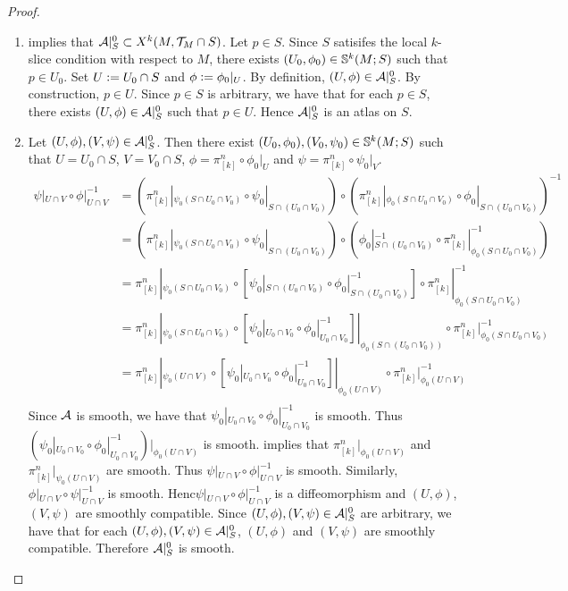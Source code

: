 \documentclass{book}
\begin{document}
	\begin{proof}\
		\begin{enumerate}
			\item {} implies that $\MA|_S^0 \subset X^k(M, \MT_M \cap S)$. Let $p \in S$. Since $S$ satisifes the local $k$-slice condition with respect to $M$, there exists $(U_0, \phi_0) \in \S^k(M; S)$ such that $p \in U_0$. Set $U \defeq U_0 \cap S$ and $\phi \defeq \phi_0|_{U}$. By definition, $(U, \phi) \in \MA|_S^0$. By construction, $p \in U$. Since $p \in S$ is arbitrary, we have that for each $p \in S$, there exists $(U, \phi) \in \MA|_S^0$ such that $p \in U$. Hence $\MA|_S^0$ is an atlas on $S$.
			\item Let $(U, \phi), (V, \psi) \in \MA|_S^0$. Then there exist $(U_0, \phi_0), (V_0, \psi_0) \in \S^k(M; S)$ such that $U = U_0 \cap S$, $V = V_0 \cap S$, $\phi = \pi^n_{[k]} \circ \phi_0|_U$ and $\psi = \pi^n_{[k]} \circ \psi_0|_V$. 
			\begin{align*}
				\psi|_{U \cap V} \circ \phi|_{U \cap V}^{-1}
				& = (\pi^n_{[k]}|_{\psi_0(S \cap U_0 \cap V_0)} \circ \psi_0|_{S \cap (U_0 \cap V_0)}) \circ (\pi^n_{[k]}|_{\phi_0(S \cap U_0 \cap V_0)} \circ \phi_0|_{S \cap (U_0 \cap V_0)})^{-1} \\
				& = (\pi^n_{[k]}|_{\psi_0(S \cap U_0 \cap V_0)} \circ \psi_0|_{S \cap (U_0 \cap V_0)}) \circ (\phi_0|_{S \cap (U_0 \cap V_0)}^{-1} \circ \pi^n_{[k]}|_{\phi_0(S \cap U_0 \cap V_0)}^{-1}) \\
				& = \pi^n_{[k]}|_{\psi_0(S \cap U_0 \cap V_0)} \circ [\psi_0|_{S \cap (U_0 \cap V_0)} \circ \phi_0|_{S \cap (U_0 \cap V_0)}^{-1}] \circ \pi^n_{[k]}|_{\phi_0(S \cap U_0 \cap V_0)}^{-1} \\
				& = \pi^n_{[k]}|_{\psi_0(S \cap U_0 \cap V_0)} \circ [\psi_0|_{U_0 \cap V_0} \circ \phi_0|_{U_0 \cap V_0}^{-1}]|_{\phi_0(S \cap (U_0 \cap V_0))} \circ \pi^n_{[k]}|_{\phi_0(S \cap U_0 \cap V_0)}^{-1} \\
				& = \pi^n_{[k]}|_{\psi_0(U \cap V)} \circ [\psi_0|_{U_0 \cap V_0} \circ \phi_0|_{U_0 \cap V_0}^{-1}]|_{\phi_0(U \cap V)} \circ \pi^n_{[k]}|_{\phi_0(U \cap V)}^{-1} \\
			\end{align*}
			Since $\MA$ is smooth, we have that $\psi_0|_{U_0 \cap V_0} \circ \phi_0|_{U_0 \cap V_0}^{-1}$ is smooth. Thus $(\psi_0|_{U_0 \cap V_0} \circ \phi_0|_{U_0 \cap V_0}^{-1})|_{\phi_0(U \cap V)}$ is smooth.  implies that $\pi^n_{[k]}|_{\phi_0(U \cap V)}$ and $\pi^n_{[k]}|_{\psi_0(U \cap V)}$ are smooth. Thus $\psi|_{U \cap V} \circ \phi|_{U \cap V}^{-1}$ is smooth. Similarly, $\phi|_{U \cap V} \circ \psi|_{U \cap V}^{-1}$ is smooth. Henc$\psi|_{U \cap V} \circ \phi|_{U \cap V}^{-1}$ is a diffeomorphism and $(U, \phi)$, $(V, \psi)$ are smoothly compatible. Since $(U, \phi), (V, \psi) \in \MA|_S^0$ are arbitrary, we have that for each $(U, \phi), (V, \psi) \in \MA|_S^0$, $(U, \phi)$ and $(V, \psi)$ are smoothly compatible. Therefore $\MA|_S^0$ is smooth.
		\end{enumerate}
	\end{proof}
\end{document}
